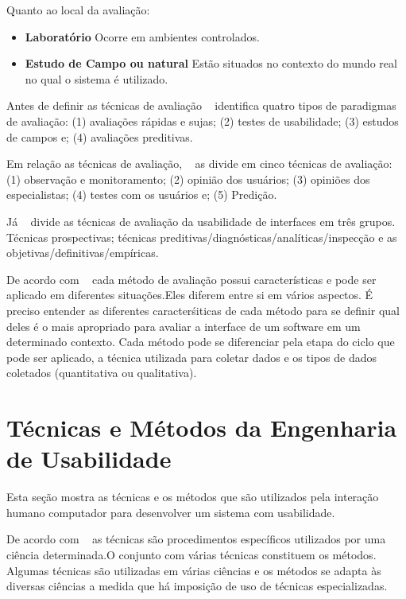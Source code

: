 	Quanto ao local da avaliação:

	\begin{itemize}
		\item \textbf{Laboratório} Ocorre em ambientes controlados.
		\item \textbf{Estudo de Campo ou natural} Estão situados no contexto do mundo real no qual o sistema é utilizado.
	\end{itemize}

	 
	Antes de definir as técnicas de avaliação ~ identifica quatro tipos de paradigmas de avaliação: (1) avaliações rápidas e sujas; (2) testes de usabilidade; (3) estudos de campos e; (4) avaliações preditivas.

	Em relação as técnicas de avaliação, ~ as divide em cinco técnicas de avaliação: (1) observação e monitoramento; (2) opinião dos usuários; (3) opiniões dos especialistas; (4) testes com os usuários e; (5) Predição. 

	Já ~ divide as técnicas de avaliação da usabilidade de interfaces em três grupos. Técnicas prospectivas; técnicas preditivas/diagnósticas/analíticas/inspecção e as objetivas/definitivas/empíricas.

	De acordo com ~ cada método de avaliação possui características e pode ser aplicado em diferentes situações.Eles diferem entre si em vários aspectos. É preciso entender as diferentes caracterśiticas de cada método para se definir qual deles é o mais apropriado para avaliar a interface de um software em um determinado contexto. Cada método pode se diferenciar pela etapa do ciclo que pode ser aplicado, a técnica utilizada para coletar dados e os tipos de dados coletados (quantitativa ou qualitativa). %


\section{Técnicas e Métodos da Engenharia de Usabilidade}

	Esta seção mostra as técnicas e os métodos que são utilizados pela interação humano computador para desenvolver um sistema com usabilidade.

	De acordo com ~ as técnicas são procedimentos específicos utilizados por uma ciência determinada.O conjunto com várias técnicas constituem os métodos. Algumas técnicas são utilizadas em várias ciências e os métodos se adapta às diversas ciências a medida que há imposição de uso de técnicas especializadas.

